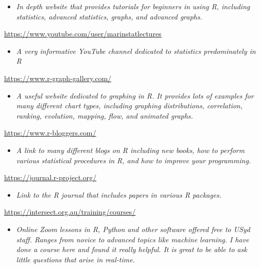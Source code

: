 \documentclass[
]{book}
\providecommand{\tightlist}{%
  \setlength{\itemsep}{0pt}\setlength{\parskip}{0pt}}
\begin{document}
\begin{itemize}
\tightlist
\item
  \emph{In depth website that provides tutorials for beginners in using R, including statistics, advanced statistics, graphs, and advanced graphs. }
\end{itemize}

\url{https://www.youtube.com/user/marinstatlectures}

\begin{itemize}
\tightlist
\item
  \emph{A very informative YouTube channel dedicated to statistics predominately in R }
\end{itemize}

\url{https://www.r-graph-gallery.com/}

\begin{itemize}
\tightlist
\item
  \emph{A useful website dedicated to graphing in R. It provides lots of examples for many different chart types, including graphing distributions, correlation, ranking, evolution, mapping, flow, and animated graphs.}
\end{itemize}

\url{https://www.r-bloggers.com/}

\begin{itemize}
\tightlist
\item
  \emph{A link to many different blogs on R including new books, how to perform various statistical procedures in R, and how to improve your programming.}
\end{itemize}

\url{https://journal.r-project.org/}

\begin{itemize}
\tightlist
\item
  \emph{Link to the R journal that includes papers in various R packages.}
\end{itemize}

\url{https://intersect.org.au/training/courses/}

\begin{itemize}
\tightlist
\item
  \emph{Online Zoom lessons in R, Python and other software offered free to USyd staff. Ranges from novice to advanced topics like machine learning. I have done a course here and found it really helpful. It is great to be able to ask little questions that arise in real-time.}
\end{itemize}
\end{document}
